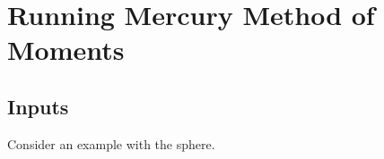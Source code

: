 % 

\section{Running Mercury Method of Moments}

\subsection{Inputs}
Consider an example with the sphere.



{\scriptsize{

}}

{\scriptsize{

}}

\endinput  %

	

